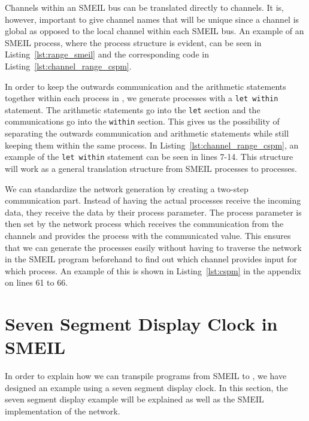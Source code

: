 
Channels within an SMEIL bus can be translated directly to \cspm{} channels. It is, however, important to give channel names that will be unique since a \cspm{} channel is global as opposed to the local channel within each SMEIL bus. An example of an SMEIL process, where the process structure is evident, can be seen in Listing~\ref{lst:range_smeil} and the corresponding \cspm{} code in Listing~\ref{lst:channel_range_cspm}.

In order to keep the outwards communication and the arithmetic statements together within each process in \cspm{}, we generate \cspm{} processes with a \texttt{let within} statement. The arithmetic statements go into the \texttt{let} section and the communications go into the \texttt{within} section. This gives us the possibility of separating the outwards communication and arithmetic statements while still keeping them within the same \cspm{} process. In Listing~\ref{lst:channel_range_cspm}, an example of the \texttt{let within} statement can be seen in lines 7-14. This structure will work as a general translation structure from SMEIL processes to \cspm{} processes.

We can standardize the network generation by creating a two-step communication part. Instead of having the actual processes receive the incoming data, they receive the data by their process parameter. The process parameter is then set by the network process which receives the communication from the channels and provides the process with the communicated value.
This ensures that we can generate the processes easily without having to traverse the network in the SMEIL program beforehand to find out which channel provides input for which process. An example of this is shown in Listing~\ref{lst:cspm} in the appendix on lines 61 to 66.




\section{Seven Segment Display Clock in SMEIL}\label{sec:example-smeil}
In order to explain how we can transpile programs from SMEIL to \cspm{}, we have designed an example using a seven segment display clock.
In this section, the seven segment display example will be explained as well as the SMEIL implementation of the network.
\\

